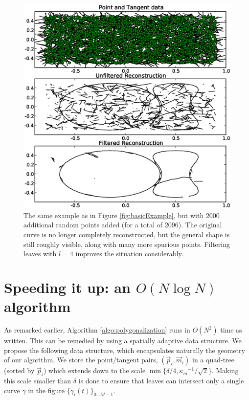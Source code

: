 \documentclass{article}
\numberwithin{cntr}{section}
\numberwithin{equation}{section}
\newcommand{\vp}[0]{{\vec{p}}}
\newcommand{\vm}[0]{{\vec{m}}}
\newcommand{\Oto}[1]{{0 \ldots #1-1}}
\newcommand{\curveSet}{{ \{ \gamma_i(t) \}_{\Oto{M}}}}
\newcommand{\curvemax}{{\kappa_{m}}}
\newcommand{\curvemaxi}{{\curvemax^{-1}}}
\newcommand{\curvesep}{{\delta}}
\begin{document}
\begin{figure}
\setlength{\unitlength}{0.240900pt}
\ifx\plotpoint\undefined\newsavebox{\plotpoint}\fi
\sbox{\plotpoint}{\rule[-0.200pt]{0.400pt}{0.400pt}}%
\includegraphics[scale=0.5]{more_noisy_example.eps}

\caption{The same example as in Figure \ref{fig:basicExample}, but with 2000 additional random points added (for a total of 2096). The original curve is no longer completely reconstructed, but the general shape is still roughly visible, along with many more spurious points. Filtering leaves with $l=4$ improves the situation considerably.}
\label{fig:moreNoisyExample}
\end{figure}

\appendix

\section{Speeding it up: an $O(N \log N)$ algorithm}
\label{sec:quadTreeSection}

As remarked earlier, Algorithm \ref{algo:polygonalization} runs in $O(N^{2})$ time as written. This can be remedied by using a spatially adaptive data structure. We propose the following data structure, which encapsulates naturally the geometry of our algorithm. We store the point/tangent pairs, $(\vp_{i},\vm_{i})$ in a quad-tree (sorted by $\vp_{i}$) which extends down to the scale $\min\{ \curvesep / 4, \curvemaxi / \sqrt{2} \}$. Making this scale smaller than $\delta$ is done to ensure that leaves can intersect only a single curve $\gamma$ in the figure $\curveSet$.
\end{document}
